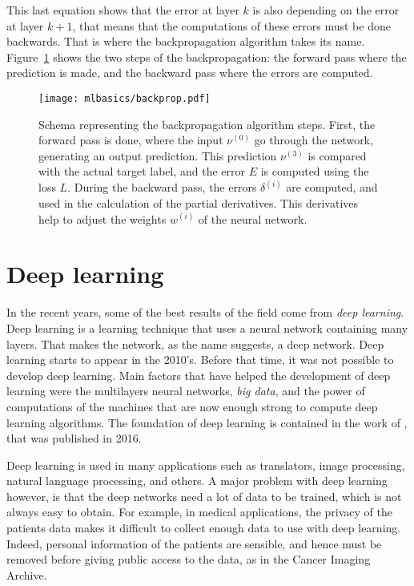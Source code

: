 This last equation shows that the error at layer $k$ is also depending on the error at layer $k+1$, that means that the computations of these errors must be done backwards. That is where the backpropagation algorithm takes its name. Figure~\ref{fig:backprop} shows the two steps of the backpropagation: the forward pass where the prediction is made, and the backward pass where the errors are computed.
\begin{figure}[t!]
  \centering
  \texttt{[image: mlbasics/backprop.pdf]}
  \caption[Backpropagation algorithm schema]{Schema representing the backpropagation algorithm steps. First, the forward pass is done, where the input $\nu^{(0)}$ go through the network, generating an output prediction. This prediction $\nu^{(3)}$ is compared with the actual target label, and the error $E$ is computed using the loss $L$. During the backward pass, the errors $\delta^{(i)}$ are computed, and used in the calculation of the partial derivatives. This derivatives help to adjust the weights $w^{(i)}$ of the neural network.}
  \label{fig:backprop}
\end{figure}

\section{Deep learning}
\label{sec:deeplearning}
In the recent years, some of the best results of the field come from \emph{deep learning}. Deep learning is a learning technique that uses a neural network containing many layers. That makes the network, as the name suggests, a deep network. Deep learning starts to appear in the 2010's. Before that time, it was not possible to develop deep learning. Main factors that have helped the development of deep learning were the multilayers neural networks, \emph{big data}, and the power of computations of the machines that are now enough strong to compute deep learning algorithms. The foundation of deep learning is contained in the work of \citet{goodfellow_deep_2016}, that was published in 2016.

Deep learning is used in many applications such as translators, image processing, natural language processing, and others. A major problem with deep learning however, is that the deep networks need a lot of data to be trained, which is not always easy to obtain. For example, in medical applications, the privacy of the patients data makes it difficult to collect enough data to use with deep learning. Indeed, personal information of the patients are sensible, and hence must be removed before giving public access to the data, as in the Cancer Imaging Archive.

